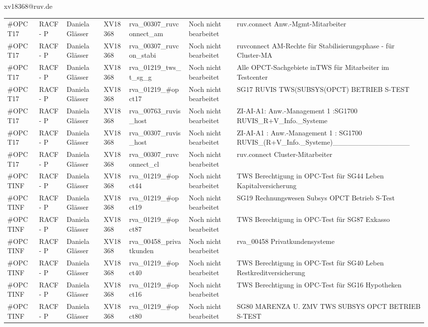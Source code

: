 \documentclass[a4paper,landscape,12pt]{letter}
\begin{document}
\begin{letter}{xv18368@ruv.de\hfill \break}
\begin{tiny}
\begin{longtable}{|p{35mm}|p{15mm}|p{25mm}|p{10mm}|p{40mm}|p{50mm}|p{50mm}|}
\#OPCT17 & RACF - P & Daniela Glässer & XV18368 & rva\_00307\_ruvconnect\_am & Noch nicht bearbeitet & ruv.connect Anw.-Mgmt-Mitarbeiter \\
\#OPCT17 & RACF - P & Daniela Glässer & XV18368 & rva\_00307\_ruvcon\_stabi & Noch nicht bearbeitet & ruvconnect AM-Rechte für Stabilisierungsphase - für Cluster-MA \\
\#OPCT17 & RACF - P & Daniela Glässer & XV18368 & rva\_01219\_tws\_t\_sg\_g & Noch nicht bearbeitet & Alle OPCT-Sachgebiete inTWS für Mitarbeiter im Testcenter \\
\#OPCT17 & RACF - P & Daniela Glässer & XV18368 & rva\_01219\_\#opct17 & Noch nicht bearbeitet & SG17 RUVIS TWS(SUBSYS(OPCT) BETRIEB S-TEST \\
\#OPCT17 & RACF - P & Daniela Glässer & XV18368 & rva\_00763\_ruvis\_host & Noch nicht bearbeitet & ZI-AI-A1: Anw.-Management 1 :SG1700 RUVIS\_R+V\_Info.\_Systeme \\
\#OPCT17 & RACF - P & Daniela Glässer & XV18368 & rva\_00307\_ruvis\_host & Noch nicht bearbeitet & ZI-AI-A1   : Anw.-Management 1 : SG1700 RUVIS\_(R+V\_Info.\_Systeme)\_\_\_\_\_\_\_\_\_\_\_\_\_\_\_ \\
\#OPCT17 & RACF - P & Daniela Glässer & XV18368 & rva\_00307\_ruvconnect\_cl & Noch nicht bearbeitet & ruv.connect Cluster-Mitarbeiter \\
\#OPCTINF & RACF - P & Daniela Glässer & XV18368 & rva\_01219\_\#opct44 & Noch nicht bearbeitet & TWS Berechtigung in OPC-Test für SG44 Leben Kapitalversicherung \\
\#OPCTINF & RACF - P & Daniela Glässer & XV18368 & rva\_01219\_\#opct19 & Noch nicht bearbeitet & SG19 Rechnungswesen Subsys OPCT Betrieb S-Test \\
\#OPCTINF & RACF - P & Daniela Glässer & XV18368 & rva\_01219\_\#opct87 & Noch nicht bearbeitet & TWS Berechtigung in OPC-Test für SG87 Exkasso \\
\#OPCTINF & RACF - P & Daniela Glässer & XV18368 & rva\_00458\_privatkunden & Noch nicht bearbeitet & rva\_00458 Privatkundensysteme \\
\#OPCTINF & RACF - P & Daniela Glässer & XV18368 & rva\_01219\_\#opct40 & Noch nicht bearbeitet & TWS Berechtigung in OPC-Test für SG40 Leben Restkreditversicherung \\
\#OPCTINF & RACF - P & Daniela Glässer & XV18368 & rva\_01219\_\#opct16 & Noch nicht bearbeitet & TWS Berechtigung in OPC-Test für SG16 Hypotheken \\
\#OPCTINF & RACF - P & Daniela Glässer & XV18368 & rva\_01219\_\#opct80 & Noch nicht bearbeitet & SG80 MARENZA U. ZMV TWS SUBSYS OPCT BETRIEB S-TEST \\

\end{longtable}
\end{tiny}
\end{letter}
\end{document}
